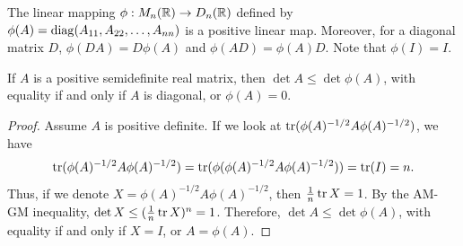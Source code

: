 The linear mapping $\phi:M_{n}(\mathbb{R}) \to D_{n}(\mathbb{R})$ defined by $\phi(A) = \operatorname{diag}(A_{11},A_{22},\ldots,A_{nn})$ is a positive linear map. Moreover, for a diagonal matrix $D$, $\phi(DA) = D\phi(A)$ and $\phi(AD) = \phi(A)D$. Note that $\phi(I) = I$.

\begin{theorem}
    If $A$ is a positive semidefinite real matrix, then $\det A \leq \det \phi(A)$, with equality if and only if $A$ is diagonal, or $\phi(A) = 0$.
\end{theorem}
\begin{proof}
    Assume $A$ is positive definite. If we look at $\operatorname{tr} (\phi(A)^{-1/2} A \phi(A)^{-1/2})$, we have
    \begin{align}
        \operatorname{tr} ( \phi(A)^{-1/2} A \phi(A)^{-1/2}) = \operatorname{tr} (\phi(\phi(A)^{-1/2} A \phi(A)^{-1/2})) = \operatorname{tr} (I) = n.
    \end{align}
    Thus, if we denote $X = \phi(A)^{-1/2} A \phi(A)^{-1/2}$, then $\frac{1}{n} \operatorname{tr} X = 1$. By the AM-GM inequality, $\det X \leq (\frac{1}{n} \operatorname{tr} X)^{n} = 1$. Therefore, $\det A \leq \det \phi(A)$, with equality if and only if $X = I$, or $A = \phi(A)$.
\end{proof}





